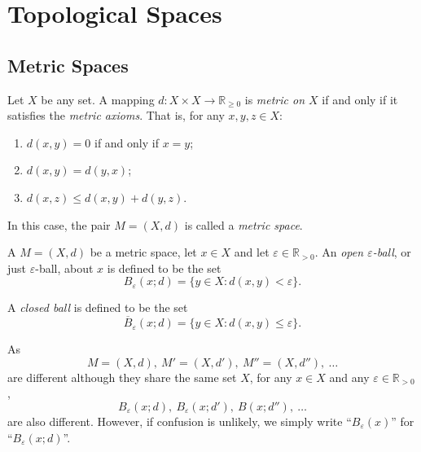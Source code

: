 \tableofcontents



\chapter{Topological Spaces}


\section{Metric Spaces}


\begin{definition}
	\label{definition: metric space}
	Let $X$ be any set. A mapping $d: X \times X \to \mathbb R_{\ge 0}$ is \textit{metric on $X$} if and only if it satisfies the \textit{metric axioms}. That is, for any $x, y, z \in X$:
	\begin{enumerate}[\bf M1. ]
		\item $d(x,y) = 0$ if and only if $x = y$;
		\item $d(x,y) = d(y,x)$;
		\item $d(x, z) \le d(x,y) + d(y,z)$.
	\end{enumerate}
	
	In this case, the pair $M = (X, d)$ is called a \textit{metric space}.
\end{definition}


\begin{definition}
	\label{definition: ball}
	A $M = (X, d)$ be a metric space, let $x \in X$ and let $\varepsilon \in \mathbb R_{> 0}$. An \textit{open $\varepsilon$-ball}, or just $\varepsilon$-ball, about $x$ is defined to be the set
	$$
	B_\varepsilon (x; d) = \{ y \in X : d(x,y) < \varepsilon \}.
	$$
	
	A \textit{closed ball} is defined to be the set
	$$
	\overline{B}_\varepsilon (x; d) = \{ y \in X : d(x,y) \le \varepsilon \}.
	$$
\end{definition}


\begin{note}
	As
	$$
	M = (X, d), \ M' = (X, d'), \ M'' = (X, d''), \ \ldots
	$$
	are different although they share the same set $X$, for any $x \in X$ and any $\varepsilon \in \mathbb R_{> 0}$,
	$$
	B_\varepsilon(x; d),\ B_\varepsilon (x; d'), \ B(x; d''), \ \ldots
	$$
	are also different. However, if confusion is unlikely, we simply write ``$B_\varepsilon(x)$'' for ``$B_\varepsilon(x; d)$''.
\end{note}


